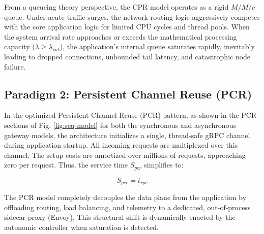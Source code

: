 \documentclass{ieeeaccess}
\begin{document}
From a queueing theory perspective, the CPR model operates as a rigid $M/M/c$ queue. Under acute traffic surges, the network routing logic aggressively competes with the core application logic for limited CPU cycles and thread pools. When the system arrival rate approaches or exceeds the mathematical processing capacity ($\lambda \ge  \lambda_{sat}$), the application’s internal queue saturates rapidly, inevitably leading to dropped connections, unbounded tail latency, and catastrophic node failure.

\subsection{Paradigm 2: Persistent Channel Reuse (PCR)}
\label{sec2.2}

In the optimized Persistent Channel Reuse (PCR) pattern, as shown in the PCR sections of Fig. \ref{fig:seq-model} for both the synchronous and asynchronous gateway models, the architecture initializes a single, thread-safe gRPC channel during application startup. All incoming requests are multiplexed over this channel. The setup costs are amortized over millions of requests, approaching zero per request. Thus, the service time $S_{pcr}$ simplifies to:

\begin{equation}
    S_{pcr} = t_{rpc}
\end{equation}

The PCR model completely decouples the data plane from the application by offloading routing, load balancing, and telemetry to a dedicated, out-of-process sidecar proxy (Envoy). This structural shift is dynamically enacted by the autonomic controller when saturation is detected.
\end{document}
